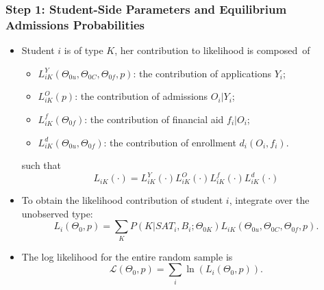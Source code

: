 \documentclass[10pt]{beamer}
\begin{document}
\begin{frame}[c]\frametitle{Step 1: Student-Side Parameters and Equilibrium Admissions Probabilities}
\begin{itemize}
    \item Student $i$ is of type $K$, her contribution to likelihood is \mbox{composed of}
\begin{itemize}
    \item $L_{iK}^{Y}(\Theta_{0u},\Theta_{0C},\Theta_{0f},p)$: the contribution of applications $Y_{i}$;
    \item $L_{iK}^{O}(p)$:  the contribution of admissions $O_{i}|Y_{i}$;
    \item $L_{iK}^{f}(\Theta_{0f})$: the contribution of financial aid $f_{i}|O_{i}$;
    \item $L_{iK}^{d}(\Theta_{0u},\Theta_{0f})$: the contribution of enrollment $d_{i}(O_{i},f_{i})$.
\end{itemize}
such that
\begin{equation*}
    L_{iK}(\cdot) = L_{iK}^{Y}(\cdot)L_{iK}^{O}(\cdot)L_{iK}^{f}(\cdot)L_{iK}^{d}(\cdot)
\end{equation*}
\item To obtain the likelihood contribution of student $i$, integrate over the unobserved type:
\begin{equation}
    L_{i}(\Theta_{0},p) = \sum_{K} P(K|SAT_{i},B_{i};\Theta_{0K})L_{iK}(\Theta_{0u},\Theta_{0C},\Theta_{0f},p).
\end{equation}
\item The log likelihood for the entire random sample is
\begin{equation}
    \mathcal{L}(\Theta_{0},p) = \sum_{i} \ln (L_{i}(\Theta_{0},p)).
\end{equation}
\end{itemize}

\end{frame}
\end{document}
